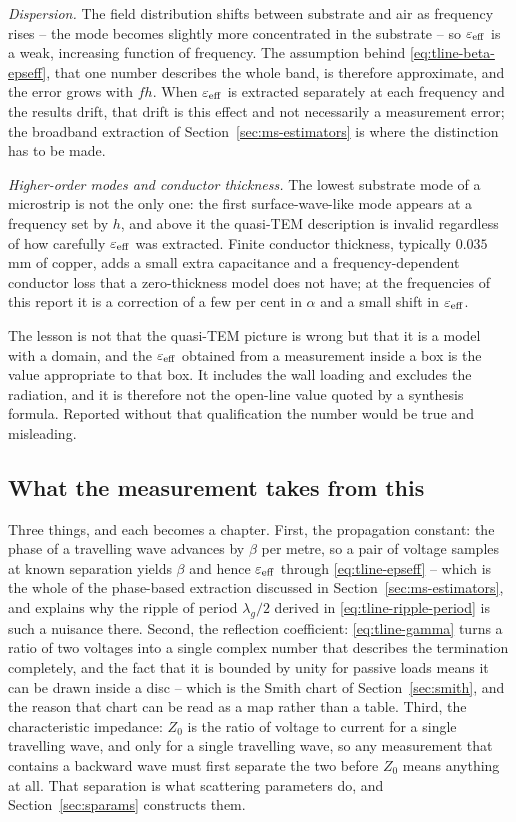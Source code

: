 \emph{Dispersion.} The field distribution shifts between substrate and air as frequency rises -- the mode becomes
slightly more concentrated in the substrate -- so $\varepsilon_{\mathrm{eff}}$ is a weak, increasing function of
frequency. The assumption behind \eqref{eq:tline-beta-epseff}, that one number describes the whole band, is
therefore approximate, and the error grows with $f h$. When $\varepsilon_{\mathrm{eff}}$ is extracted separately at each
frequency and the results drift, that drift is this effect and not necessarily a measurement error; the
broadband extraction of Section~\ref{sec:ms-estimators} is where the distinction has to be made.

\emph{Higher-order modes and conductor thickness.} The lowest substrate mode of a microstrip is not the only one:
the first surface-wave-like mode appears at a frequency set by $h$, and above it the quasi-TEM description is
invalid regardless of how carefully $\varepsilon_{\mathrm{eff}}$ was extracted. Finite conductor thickness, typically
$0.035$ mm of copper, adds a small extra capacitance and a frequency-dependent conductor loss that a
zero-thickness model does not have; at the frequencies of this report it is a correction of a few per cent in
$\alpha$ and a small shift in $\varepsilon_{\mathrm{eff}}$.

The lesson is not that the quasi-TEM picture is wrong but that it is a model with a domain, and the
$\varepsilon_{\mathrm{eff}}$ obtained from a measurement inside a box is the value appropriate to that box. It includes
the wall loading and excludes the radiation, and it is therefore not the open-line value quoted by a synthesis
formula. Reported without that qualification the number would be true and misleading.

\subsection{What the measurement takes from this}
\label{sec:tline-summary}

Three things, and each becomes a chapter. First, the propagation constant: the phase of a travelling wave
advances by $\beta$ per metre, so a pair of voltage samples at known separation yields $\beta$ and hence
$\varepsilon_{\mathrm{eff}}$ through \eqref{eq:tline-epseff} -- which is the whole of the phase-based extraction
discussed in Section~\ref{sec:ms-estimators}, and explains why the ripple of period $\lambda_g/2$ derived in
\eqref{eq:tline-ripple-period} is such a nuisance there. Second, the reflection coefficient:
\eqref{eq:tline-gamma} turns a ratio of two voltages into a single complex number that describes the termination
completely, and the fact that it is bounded by unity for passive loads means it can be drawn inside a disc --
which is the Smith chart of Section~\ref{sec:smith}, and the reason that chart can be read as a map rather than
a table. Third, the characteristic impedance: $Z_0$ is the ratio of voltage to current for a single travelling
wave, and only for a single travelling wave, so any measurement that contains a backward wave must first
separate the two before $Z_0$ means anything at all. That separation is what scattering parameters do, and
Section~\ref{sec:sparams} constructs them.


